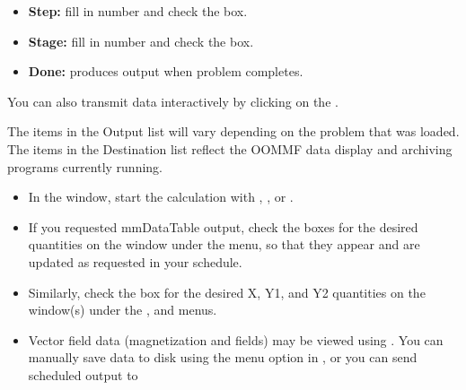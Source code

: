 \begin{list}{}{\setlength{\labelwidth}{0pt}
               \setlength{\leftmargin}{0pt}
               \setlength{\rightmargin}{\leftmargin}
               \setlength{\itemsep}{0pt}}
\begin{description}
\begin{itemize}
\begin{enumerate}
         \begin{itemize}
            \item {\bf Step:} fill in number and check the box.
            \item {\bf Stage:} fill in number and check the box.
            \item {\bf Done:} produces output when problem completes.
         \end{itemize}
         You can also transmit data interactively by clicking on the
         .
      \end{enumerate}
      The items in the Output list will vary depending on the
      problem that was loaded.  The items in the Destination list
      reflect the OOMMF data display and archiving programs currently
      running.
    \end{itemize}
    \item[Start calculation:]\blankspace
    \begin{itemize}
       \item In the  window, start the calculation with
         , , or
         .
       \item If you requested mmDataTable output, check the boxes for the
         desired quantities on the
         window under
         the  menu, so that they appear and are updated as
         requested in your schedule.
       \item Similarly, check the box for the desired X, Y1, and Y2
         quantities on the
         window(s) under the ,  and  menus.
    \end{itemize}
    \item[Save and/or display results:]\blankspace
    \begin{itemize}
      \item Vector field data (magnetization and fields) may be
        viewed using
        .
        You can 
        manually save data to disk using
        the  menu option in ,
        or you can send scheduled output to
\end{itemize}
\end{description}
\end{list}

